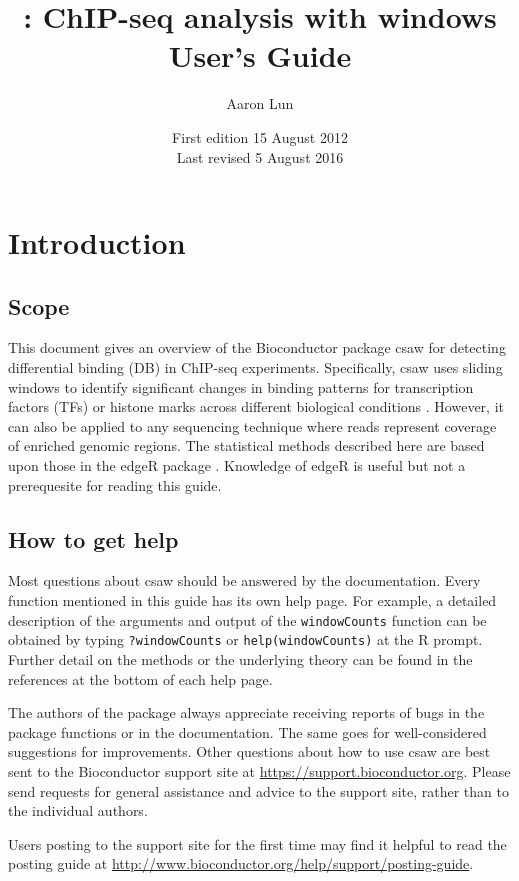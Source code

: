 \documentclass[12pt]{report}
\title{\pkgname{}: ChIP-seq analysis with windows \\ \vspace{0.2in} User's Guide}
\author{Aaron Lun}
\date{First edition 15 August 2012\\
\vspace{6pt}
Last revised 5 August 2016}
\newcommand{\edger}{edgeR}
\newcommand{\pkgname}{csaw}
\newcommand{\code}[1]{{\small\texttt{#1}}}
\newcommand{\R}{\textsf{R}}
\begin{document}
\maketitle
\tableofcontents


\newpage
{}

\chapter{Introduction}
\section{Scope}
This document gives an overview of the Bioconductor package \pkgname{} for detecting differential binding (DB) in ChIP-seq experiments.
Specifically, \pkgname{} uses sliding windows to identify significant changes in binding patterns for transcription factors (TFs) or histone marks across different biological conditions \citep{lun2016csaw}.
However, it can also be applied to any sequencing technique where reads represent coverage of enriched genomic regions.
The statistical methods described here are based upon those in the \edger{} package \citep{robinson2010}. 
Knowledge of \edger{} is useful but not a prerequesite for reading this guide.

\section{How to get help}
Most questions about \pkgname{} should be answered by the documentation. 
Every function mentioned in this guide has its own help page. 
For example, a detailed description of the arguments and output of the \code{windowCounts} function can be obtained by typing \code{?windowCounts} or \code{help(windowCounts)} at the \R{} prompt. 
Further detail on the methods or the underlying theory can be found in the references at the bottom of each help page.

The authors of the package always appreciate receiving reports of bugs in the package functions or in the documentation. 
The same goes for well-considered suggestions for improvements. 
Other questions about how to use \pkgname{} are best sent to the Bioconductor support site at \url{https://support.bioconductor.org}.
Please send requests for general assistance and advice to the support site, rather than to the individual authors. 

Users posting to the support site for the first time may find it helpful to read the posting guide at \url{http://www.bioconductor.org/help/support/posting-guide}.
\end{document}
